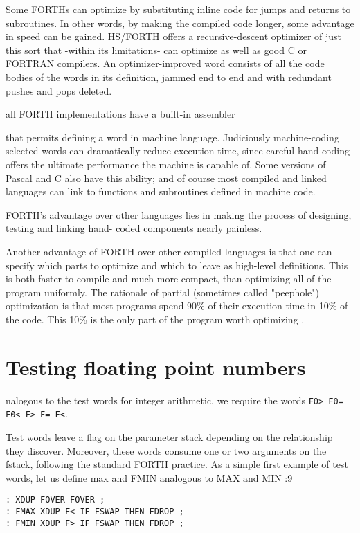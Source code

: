 Some FORTHs can optimize by substituting inline code for jumps
and returns to subroutines. In other words, by making the compiled code longer,
some advantage in speed can be gained.
HS/FORTH offers a recursive-descent optimizer of just this sort
that -within its limitations- can optimize as well as good C or
FORTRAN compilers. An optimizer-improved word consists of
all the code bodies of the words in its definition, jammed end to
end and with redundant pushes and pops deleted.

 all FORTH implementations have a built-in assembler

that permits defining a word in machine language. Judiciously
machine-coding selected words can dramatically reduce execution time, since
careful hand coding offers the ultimate performance the machine is capable of.
Some versions of Pascal and C
also have this ability; and of course most compiled and linked
languages can link to functions and subroutines defined in
machine code.

FORTH’s advantage over other languages lies in making the 
process of designing, testing and linking hand- coded components
nearly painless.

Another advantage of FORTH over other compiled languages is
that one can specify which parts to optimize and which to leave
as high-level definitions. This is both faster to compile and much
more compact, than optimizing all of the program uniformly. The
rationale of partial (sometimes called "peephole") optimization
is that most programs spend 90\% of their execution time in 10\%
of the code. This 10\% is the only part of the program worth
optimizing .

\section{Testing floating point numbers}

 nalogous to the test words for integer arithmetic, we require
the words \verb|F0> F0= F0< F> F= F<|.

Test words leave a ﬂag on the parameter stack depending on the
relationship they discover. Moreover, these words consume one
or two arguments on the fstack, following the standard FORTH
practice. As a simple first example of test words, let us define
max and FMIN analogous to MAX and MIN :9
\begin{verbatim}
: XDUP FOVER FOVER ;
: FMAX XDUP F< IF FSWAP THEN FDROP ;
: FMIN XDUP F> IF FSWAP THEN FDROP ;
\end{verbatim}

